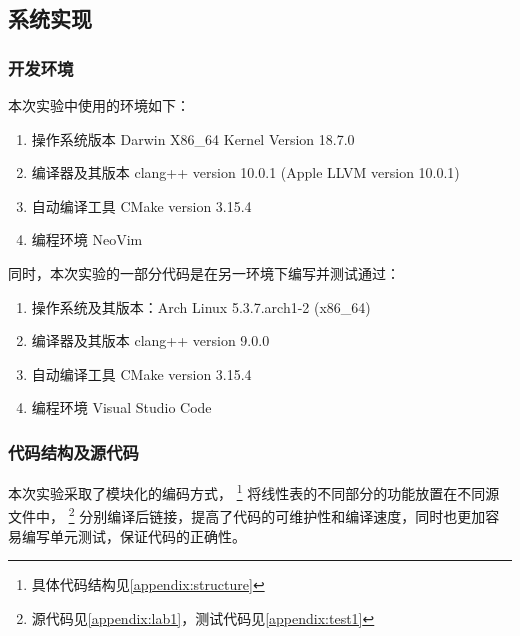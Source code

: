 \subsection{系统实现}
\subsubsection{开发环境}
本次实验中使用的环境如下：
\begin{enumerate}
    \item 操作系统版本 Darwin X86\_64 Kernel Version 18.7.0
    \item 编译器及其版本 clang++ version 10.0.1 (Apple LLVM version 10.0.1)
    \item 自动编译工具 CMake version 3.15.4
    \item 编程环境 NeoVim
\end{enumerate}
同时，本次实验的一部分代码是在另一环境下编写并测试通过：
\begin{enumerate}
    \item 操作系统及其版本：Arch Linux 5.3.7.arch1-2 (x86\_64)
    \item 编译器及其版本 clang++ version 9.0.0
    \item 自动编译工具 CMake version 3.15.4
    \item 编程环境 Visual Studio Code
\end{enumerate}
\subsubsection{代码结构及源代码}
本次实验采取了模块化的编码方式，
\footnote{具体代码结构见\autoref{appendix:structure}}
将线性表的不同部分的功能放置在不同源文件中，
\footnote{源代码见\autoref{appendix:lab1}，测试代码见\autoref{appendix:test1}}
分别编译后链接，提高了代码的可维护性和编译速度，同时也更加容易编写单元测试，保证代码的正确性。
